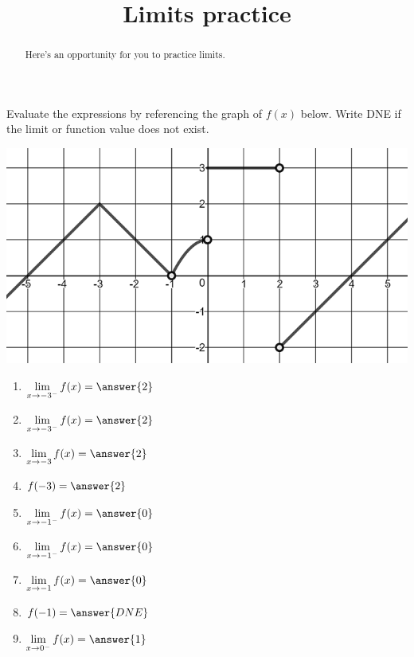 \documentclass[handout]{ximera}
\title{Limits practice}
\begin{document}
\begin{abstract}
Here's an opportunity for you to practice limits.
\end{abstract}
\maketitle

\begin{exercise}
  Evaluate the expressions by referencing the graph of $f(x)$ below. Write DNE if the limit or function value does not exist.
  
\begin{center} \includegraphics[scale=0.5]{limgraph.png} \end{center}

\begin{enumerate}
\item $\displaystyle\lim_{x\to -3^-} f(x) =\answer{2}$  

\item $\displaystyle\lim_{x\to -3^-} f(x) = \answer{2}$ 

\item $\displaystyle\lim_{x\to -3} f(x) = \answer{2}$ 

\item $f(-3) = \answer{2}$

\item $\displaystyle\lim_{x\to -1^-} f(x) =\answer{0}$ 

\item $\displaystyle\lim_{x\to -1^-} f(x) = \answer{0}$ 

\item $\displaystyle\lim_{x\to -1} f(x) = \answer{0}$ 

\item $f(-1) = \answer{DNE}$

\item $\displaystyle\lim_{x\to 0^-} f(x) =\answer{1}$ 


\end{enumerate}
\end{exercise}
\end{document}
